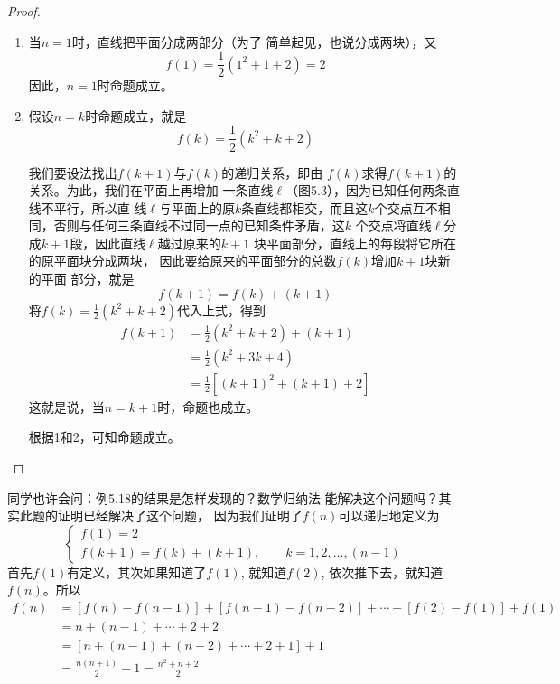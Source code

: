 \begin{proof}
\begin{enumerate}
    \item 当$n=1$时，直线把平面分成两部分（为了
    简单起见，也说分成两块），又
  \[  f(1)=\frac{1}{2}(1^2+1+2)=2\]
    因此，$n=1$时命题成立。
   \item 假设$n=k$时命题成立，就是
\[f(k)=\frac{1}{2}(k^2+k+2)\]

我们要设法找出$f(k+1)$与$f(k)$的递归关系，即由
$f(k)$求得$f(k+1)$的关系。为此，我们在平面上再增加
一条直线$\ell$（图5.3），因为已知任何两条直线不平行，所以直
线$\ell$与平面上的原$k$条直线都相交，而且这$k$个交点互不相
同，否则与任何三条直线不过同一点的已知条件矛盾，这$k$
个交点将直线$\ell$分成$k+1$段，因此直线$\ell$越过原来的$k+1$
块平面部分，直线上的每段将它所在的原平面块分成两块，
因此要给原来的平面部分的总数$f(k)$增加$k+1$块新的平面
部分，就是
\[f(k+1)=f(k)+(k+1)\]
将$f(k)=\frac{1}{2}(k^2+k+2)$代入上式，得到
\[\begin{split}
    f(k+1)&=\frac{1}{2}(k^2+k+2)+(k+1)\\
    &=\frac{1}{2}(k^2+3k+4)\\
    &=\frac{1}{2}[(k+1)^2+(k+1)+2]
\end{split}\]
这就是说，当$n=k+1$时，命题也成立。

\begin{figure}[htp]
    \centering
{}
    \caption{}
\end{figure}


根据1和2，可知命题成立。
\end{enumerate}
\end{proof}

同学也许会问：例5.18的结果是怎样发现的？数学归纳法
能解决这个问题吗？其实此题的证明已经解决了这个问题，
因为我们证明了$f(n)$可以递归地定义为
\[\begin{cases}
    f(1)=2\\
    f(k+1)=f(k)+(k+1),\qquad k=1,2,\ldots,(n-1)
\end{cases}\]
首先$f(1)$有定义，其次如果知道了$f(1)$, 就知道$f(2)$,
依次推下去，就知道$f(n)$。所以
\[\begin{split}
  f(n)&=[f(n)-f(n-1)]+[f(n-1)-f(n-2)]+\cdots +[f(2)-f(1)]+f(1)\\
  &=n+(n-1)+\cdots +2+2\\
  &=[n+(n-1)+(n-2)+\cdots +2+1]+1\\
  &=\frac{n(n+1)}{2}+1=\frac{n^2+n+2}{2}  
\end{split}\]

